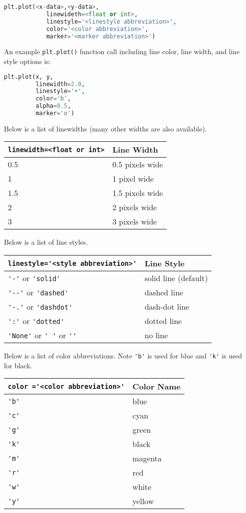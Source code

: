 \documentclass{book}
\newcommand{\passthrough}[1]{#1}
\begin{document}
\begin{lstlisting}[language=Python]
plt.plot(<x-data>,<y-data>,
            linewideth=<float or int>,
            linestyle='<linestyle abbreviation>',
            color='<color abbreviation>',
            marker='<marker abbreviation>')
\end{lstlisting}

An example \passthrough{\lstinline!plt.plot()!} function call including
line color, line width, and line style options is:

\begin{lstlisting}[language=Python]
plt.plot(x, y,
         linewidth=2.0,
         linestyle='+',
         color='b',
         alpha=0.5,
         marker='o')
\end{lstlisting}

Below is a list of linewidths (many other widths are also available).

\begin{longtable}[]{@{}ll@{}}
\toprule
\passthrough{\lstinline!linewidth=<float or int>!} & Line
Width\tabularnewline
\midrule
\endhead
0.5 & 0.5 pixels wide\tabularnewline
1 & 1 pixel wide\tabularnewline
1.5 & 1.5 pixels wide\tabularnewline
2 & 2 pixels wide\tabularnewline
3 & 3 pixels wide\tabularnewline
\bottomrule
\end{longtable}

Below is a list of line styles.

\begin{longtable}[]{@{}ll@{}}
\toprule
\passthrough{\lstinline!linestyle='<style abbreviation>'!} & Line
Style\tabularnewline
\midrule
\endhead
\passthrough{\lstinline!'-'!} or \passthrough{\lstinline!'solid'!} &
solid line (default)\tabularnewline
\passthrough{\lstinline!'--'!} or \passthrough{\lstinline!'dashed'!} &
dashed line\tabularnewline
\passthrough{\lstinline!'-.'!} or \passthrough{\lstinline!'dashdot'!} &
dash-dot line\tabularnewline
\passthrough{\lstinline!':'!} or \passthrough{\lstinline!'dotted'!} &
dotted line\tabularnewline
\passthrough{\lstinline!'None'!} or \passthrough{\lstinline!' '!} or
\passthrough{\lstinline!''!} & no line\tabularnewline
\bottomrule
\end{longtable}

Below is a list of color abbreviations. Note
\passthrough{\lstinline!'b'!} is used for blue and
\passthrough{\lstinline!'k'!} is used for black.

\begin{longtable}[]{@{}ll@{}}
\toprule
\passthrough{\lstinline!color ='<color abbreviation>'!} & Color
Name\tabularnewline
\midrule
\endhead
\passthrough{\lstinline!'b'!} & blue\tabularnewline
\passthrough{\lstinline!'c'!} & cyan\tabularnewline
\passthrough{\lstinline!'g'!} & green\tabularnewline
\passthrough{\lstinline!'k'!} & black\tabularnewline
\passthrough{\lstinline!'m'!} & magenta\tabularnewline
\passthrough{\lstinline!'r'!} & red\tabularnewline
\passthrough{\lstinline!'w'!} & white\tabularnewline
\passthrough{\lstinline!'y'!} & yellow\tabularnewline
\bottomrule
\end{longtable}
\end{document}
